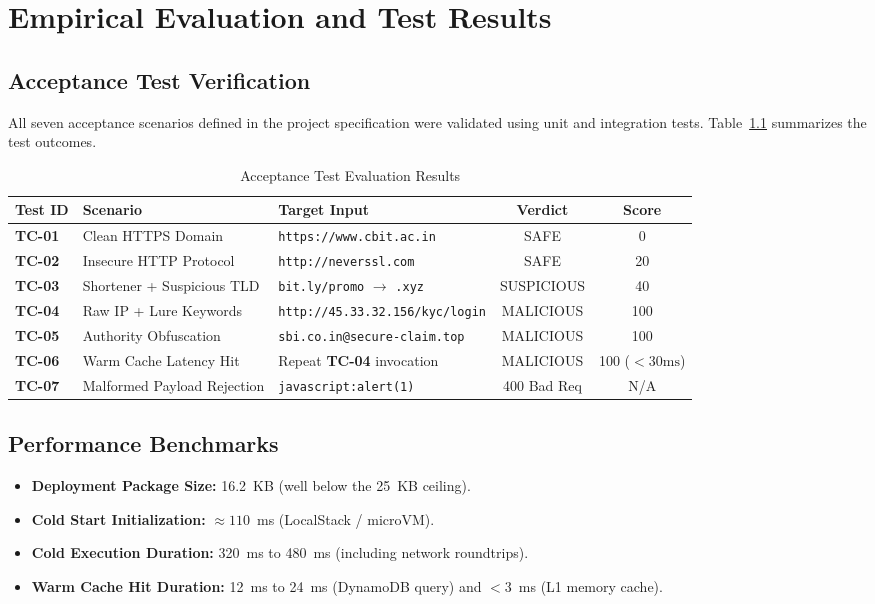 \documentclass[12pt,a4paper]{report}
\begin{document}
\chapter{Empirical Evaluation and Test Results}

\section{Acceptance Test Verification}
All seven acceptance scenarios defined in the project specification were validated using unit and integration tests. Table~\ref{tab:test_results} summarizes the test outcomes.

\begin{table}[htbp]
\centering
\caption{Acceptance Test Evaluation Results}
\label{tab:test_results}
\begin{tabularx}{\textwidth}{l p{4cm} X c c}
\toprule
\textbf{Test ID} & \textbf{Scenario} & \textbf{Target Input} & \textbf{Verdict} & \textbf{Score} \\
\midrule
\textbf{TC-01} & Clean HTTPS Domain & \texttt{https://www.cbit.ac.in} & SAFE & 0 \\
\textbf{TC-02} & Insecure HTTP Protocol & \texttt{http://neverssl.com} & SAFE & 20 \\
\textbf{TC-03} & Shortener + Suspicious TLD & \texttt{bit.ly/promo} $\rightarrow$ \texttt{.xyz} & SUSPICIOUS & 40 \\
\textbf{TC-04} & Raw IP + Lure Keywords & \texttt{http://45.33.32.156/kyc/login} & MALICIOUS & 100 \\
\textbf{TC-05} & Authority Obfuscation & \texttt{sbi.co.in@secure-claim.top} & MALICIOUS & 100 \\
\textbf{TC-06} & Warm Cache Latency Hit & Repeat \textbf{TC-04} invocation & MALICIOUS & 100 ($< 30\text{ms}$) \\
\textbf{TC-07} & Malformed Payload Rejection & \texttt{javascript:alert(1)} & 400 Bad Req & N/A \\
\bottomrule
\end{tabularx}
\end{table}

\section{Performance Benchmarks}
\begin{itemize}
    \item \textbf{Deployment Package Size:} 16.2~KB (well below the 25~KB ceiling).
    \item \textbf{Cold Start Initialization:} $\approx 110$~ms (LocalStack / microVM).
    \item \textbf{Cold Execution Duration:} 320~ms to 480~ms (including network roundtrips).
    \item \textbf{Warm Cache Hit Duration:} 12~ms to 24~ms (DynamoDB query) and $< 3$~ms (L1 memory cache).
\end{itemize}
\end{document}

